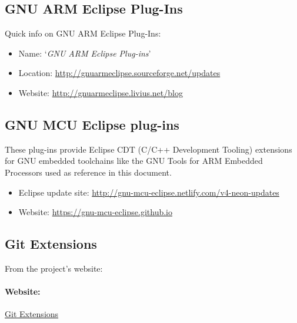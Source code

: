 \subsection{GNU ARM Eclipse Plug-Ins}

{Quick info on GNU ARM Eclipse Plug-Ins:}

\begin{itemize}
\tightlist
\item
  {Name: }{`\emph{GNU ARM Eclipse Plug-ins}'}
\item
  {Location:
  }{\href{http://gnuarmeclipse.sourceforge.net/updates}{http://gnuarmeclipse.sourceforge.net/updates}}
\item
  {Website:
  }{\href{http://gnuarmeclipse.livius.net/blog}{http://gnuarmeclipse.livius.net/blog}}
\end{itemize}


\subsection{GNU MCU Eclipse plug-ins}

These plug-ins provide Eclipse CDT (C/C++ Development Tooling) extensions for GNU embedded toolchains like the GNU Tools for ARM Embedded Processors used as reference in this document.

\begin{itemize}
\tightlist
\item
	{Eclipse update site:
	}{\href{http://gnu-mcu-eclipse.netlify.com/v4-neon-updates}{http://gnu-mcu-eclipse.netlify.com/v4-neon-updates}}
\item
	{Website:
	}{\href{https://gnu-mcu-eclipse.github.io}{https://gnu-mcu-eclipse.github.io}}
\end{itemize}

\subsection{Git Extensions}

From the project's website: \\


\paragraph{Website: }\href{http://git-extensions-documentation.readthedocs.io/en/latest/git_extensions.html}{Git Extensions}


